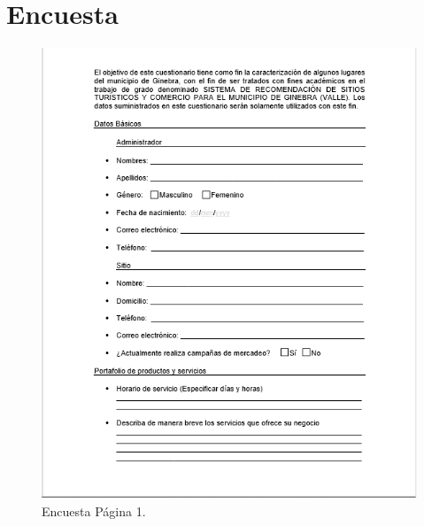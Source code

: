 \documentclass[12pt,letterpaper,openany]{book}
\begin{document}
\chapter{Encuesta}\label{aped.d}
\begin{figure}[H]
\begin{center}
\includegraphics[width=12cm]{./imagenes/Encuesta1}
\caption{Encuesta Página 1.}
\end{center}
\end{figure}
\end{document}
